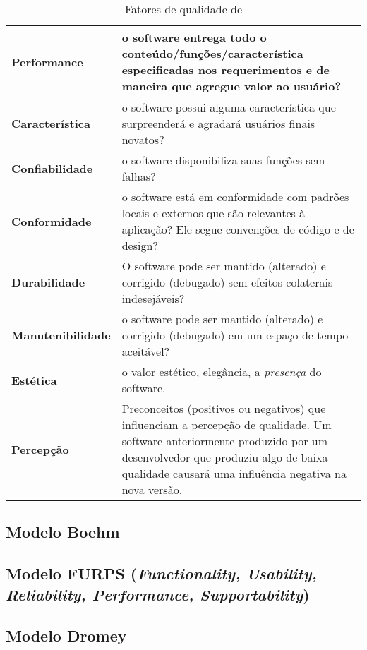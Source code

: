 \documentclass[
	12pt,				%
	openright,			%
	twoside,			%
	a4paper,			%
	english,			%
	brazil,				%
	]{abntex2}
\begin{document}
\begin{table}[h]
    \caption{Fatores de qualidade de }
    \label{tab:qualidade_mccal}
    \begin{tabular}{p{3.7cm}|p{11cm}}
        \textbf{Performance} & o software entrega todo o conteúdo/funções/característica especificadas nos requerimentos e de maneira que agregue valor ao usuário? \\ \hline
        \textbf{Característica} & o software possui alguma característica que surpreenderá e agradará usuários finais novatos? \\ \hline
        \textbf{Confiabilidade} & o software disponibiliza suas funções sem falhas? \\ \hline
        \textbf{Conformidade} & o software está em conformidade com padrões locais e externos que são relevantes à aplicação? Ele segue convenções de código e de design? \\ \hline
        \textbf{Durabilidade} & O software pode ser mantido (alterado) e corrigido (debugado) sem efeitos colaterais indesejáveis? \\ \hline
        \textbf{Manutenibilidade} & o software pode ser mantido (alterado) e corrigido (debugado) em um espaço de tempo aceitável? \\ \hline
        \textbf{Estética} & o valor estético, elegância, a \emph{presença} do software.\\ \hline
        \textbf{Percepção} & Preconceitos (positivos ou negativos) que influenciam a percepção de qualidade. Um software anteriormente produzido por um desenvolvedor que produziu algo de baixa qualidade causará uma influência negativa na nova versão.\\
  \end{tabular}
\end{table}


\subsection{Modelo Boehm}


\subsection{Modelo FURPS (\emph{Functionality, Usability, Reliability, Performance,
Supportability})}


\subsection{Modelo Dromey}
\end{document}
